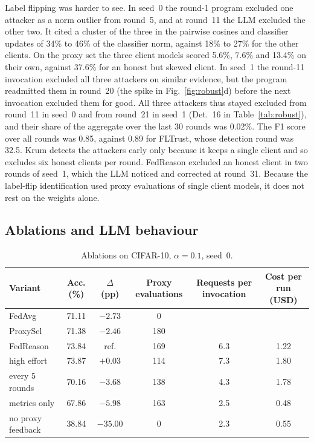 \documentclass[3p,times,a4paper]{elsarticle}
\begin{document}
Label flipping was harder to see. In seed~0 the round-1 program excluded one attacker as a norm outlier from round~5, and at round~11 the LLM excluded the other two. It cited a cluster of the three in the pairwise cosines and classifier updates of 34\% to 46\% of the classifier norm, against 18\% to 27\% for the other clients. On the proxy set the three client models scored 5.6\%, 7.6\% and 13.4\% on their own, against 37.6\% for an honest but skewed client. In seed~1 the round-11 invocation excluded all three attackers on similar evidence, but the program readmitted them in round~20 (the spike in Fig.~\ref{fig:robust}d) before the next invocation excluded them for good. All three attackers thus stayed excluded from round~11 in seed~0 and from round~21 in seed~1 (Det.\ 16 in Table~\ref{tab:robust}), and their share of the aggregate over the last 30 rounds was 0.02\%. The F1 score over all rounds was 0.85, against 0.89 for FLTrust, whose detection round was 32.5. Krum detects the attackers early only because it keeps a single client and so excludes six honest clients per round. FedReason excluded an honest client in two rounds of seed~1, which the LLM noticed and corrected at round~31. Because the label-flip identification used proxy evaluations of single client models, it does not rest on the weights alone.

\subsection{Ablations and LLM behaviour}
\label{sec:res-llm}

\begin{table}[t]
\centering
\caption{Ablations on CIFAR-10, $\alpha=0.1$, seed~0.}
\label{tab:ablation}
\small
\begin{tabular}{@{}lccccc@{}}
\toprule
Variant & Acc. (\%) & $\Delta$ (pp) & Proxy evaluations & Requests per invocation & Cost per run (USD) \\
\midrule
FedAvg & 71.11 & $-2.73$ & 0 & & \\
ProxySel & 71.38 & $-2.46$ & 180 & & \\
FedReason & 73.84 & ref. & 169 & 6.3 & 1.22 \\
\quad high effort & 73.87 & $+0.03$ & 114 & 7.3 & 1.80 \\
\quad every 5 rounds & 70.16 & $-3.68$ & 138 & 4.3 & 1.78 \\
\quad metrics only & 67.86 & $-5.98$ & 163 & 2.5 & 0.48 \\
\quad no proxy feedback & 38.84 & $-35.00$ & 0 & 2.3 & 0.55 \\
\bottomrule
\end{tabular}
\end{table}
\end{document}
